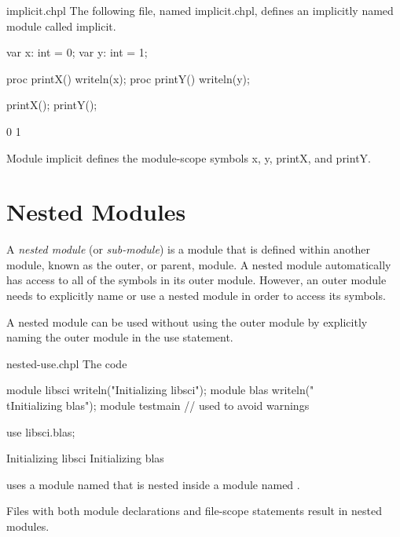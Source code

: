 \begin{chapelexample}{implicit.chpl}
The following file, named implicit.chpl, defines an implicitly named
module called implicit.
\begin{chapel}
var x: int = 0;
var y: int = 1;

proc printX() {
  writeln(x);
}
proc printY() {
  writeln(y);
}
\end{chapel}
\begin{chapelpost}
printX();
printY();
\end{chapelpost}
\begin{chapeloutput}
0
1
\end{chapeloutput}
Module implicit defines the module-scope symbols x, y, printX, and
printY.
\end{chapelexample}


\section{Nested Modules}
\label{Nested_Modules}

A \emph{nested module} (or \emph{sub-module}) is a module that is
defined within another module, known as the outer, or parent, module.
A nested module automatically has access to all of the symbols in its
outer module.  However, an outer module needs to explicitly name or
use a nested module in order to access its symbols.

A nested module can be used without using the outer module by
explicitly naming the outer module in the use statement.
\begin{chapelexample}{nested-use.chpl}
The code
\begin{chapelpre}
module libsci {
  writeln("Initializing libsci");
  module blas {
    writeln("\\tInitializing blas");
  }
}
module testmain { // used to avoid warnings
}
\end{chapelpre}
\begin{chapel}
use libsci.blas;
\end{chapel}
\begin{chapeloutput}
Initializing libsci
	Initializing blas
\end{chapeloutput}
uses a module named  that is nested inside a module
named .
\end{chapelexample}

Files with both module declarations and file-scope statements result in
nested modules.

